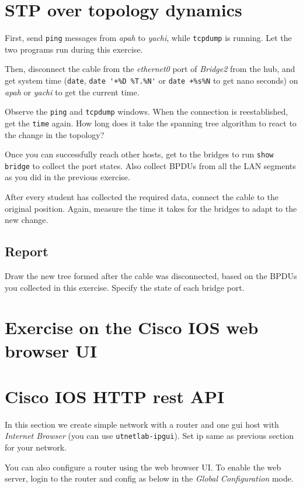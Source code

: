 \documentclass{../UTNetLab}
\begin{document}
\section{STP over topology dynamics}
    First, send \lstinline{ping} messages from \textit{apah} to \textit{yachi}, while \lstinline{tcpdump} is running.
    Let the two programs run during this exercise.

    Then, disconnect the cable from the \textit{ethernet0} port of \textit{Bridge2} from the hub, and get system time (\lstinline{date}, \lstinline{date '+%D %T.%N'} or \lstinline{date +%s%N} to get nano seconds) on \textit{apah} or \textit{yachi} to get the current time.

    Observe the \lstinline{ping} and \lstinline{tcpdump} windows. When the connection is reestablished, get the \lstinline{time} again. How long does it take the spanning tree algorithm to react to the change in the topology?

    Once you can successfully reach other hosts, get to the bridges to run \lstinline[language={cisco}]{show bridge} to collect the port states. Also collect BPDUs from all the LAN segments as you did in the previous exercise.

    After every student has collected the required data, connect the cable to the original position. Again, measure the time it takes for the bridges to adapt to the new change.
    
    \subsection*{Report}
    Draw the new tree formed after the cable was disconnected, based on the BPDUs you collected in this exercise. Specify the state of each bridge port.

    \section*{Exercise on the Cisco IOS web browser UI}
\section{Cisco IOS HTTP rest API}
    In this section we create simple network with a router and one gui host with \textit{Internet Browser} (you can use \texttt{utnetlab-ipgui}). Set ip same as previous section for your network.

    You can also configure a router using the web browser UI. To enable the web server, login to the router and config as below  in the \textit{Global Configuration} mode. 
\end{document}
